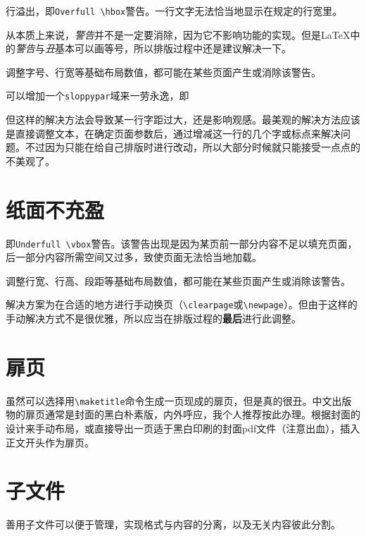 \documentclass[10pt,openany]{book}
\begin{document}
行溢出，即\texttt{Overfull\ \textbackslash{}hbox}警告。一行文字无法恰当地显示在规定的行宽里。

从本质上来说，\textit{警告}并不是一定要消除，因为它不影响功能的实现。但是{\LaTeX}中的\textit{警告}与\textit{丑}基本可以画等号，所以排版过程中还是建议解决一下。

调整字号、行宽等基础布局数值，都可能在某些页面产生或消除该警告。

可以增加一个\texttt{sloppypar}域来一劳永逸，即



但这样的解决方法会导致某一行字距过大，还是影响观感。最美观的解决方法应该是直接调整文本，在确定页面参数后，通过增减这一行的几个字或标点来解决问题。不过因为只能在给自己排版时进行改动，所以大部分时候就只能接受一点点的不美观了。

\section{纸面不充盈}

即\texttt{Underfull\ \textbackslash{}vbox}警告。该警告出现是因为某页前一部分内容不足以填充页面，后一部分内容所需空间又过多，致使页面无法恰当地加载。

调整行宽、行高、段距等基础布局数值，都可能在某些页面产生或消除该警告。

解决方案为在合适的地方进行手动换页（\texttt{\textbackslash{}clearpage}或\texttt{\textbackslash{}newpage}）。但由于这样的手动解决方式不是很优雅，所以应当在排版过程的\textbf{最后}进行此调整。

\section{扉页}

虽然可以选择用\texttt{\textbackslash{}maketitle}命令生成一页现成的扉页，但是真的很丑。中文出版物的扉页通常是封面的黑白朴素版，内外呼应，我个人推荐按此办理。根据封面的设计来手动布局，或直接导出一页适于黑白印刷的封面pdf文件（注意出血），插入正文开头作为扉页。



\section{子文件}

善用子文件可以便于管理，实现格式与内容的分离，以及无关内容彼此分割。
\end{document}
